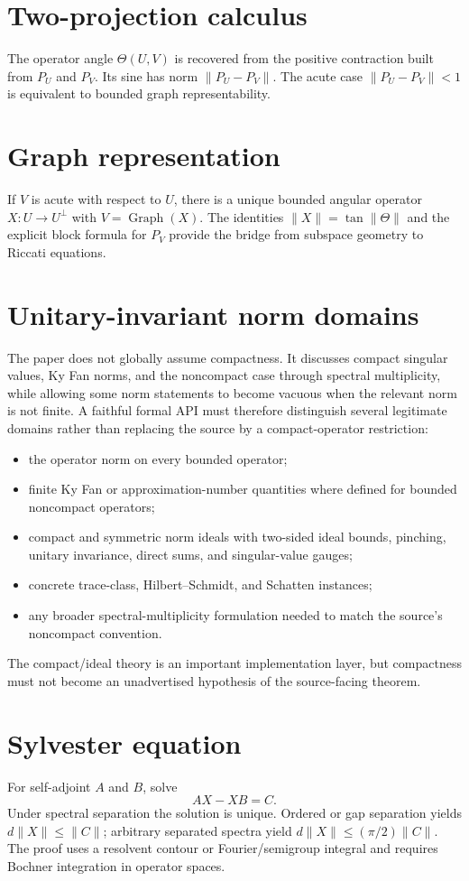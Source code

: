 \documentclass{article}
\newcommand{\Graph}{\operatorname{Graph}}
\begin{document}
\section{Two-projection calculus}
The operator angle $\Theta(U,V)$ is recovered from the positive contraction
built from $P_U$ and $P_V$.  Its sine has norm $\|P_U-P_V\|$.  The acute case
$\|P_U-P_V\|<1$ is equivalent to bounded graph representability.

\section{Graph representation}
If $V$ is acute with respect to $U$, there is a unique bounded angular
operator $X:U\to U^\perp$ with $V=\Graph(X)$.  The identities
$\|X\|=\tan\|\Theta\|$ and the explicit block formula for $P_V$ provide the
bridge from subspace geometry to Riccati equations.

\section{Unitary-invariant norm domains}
The paper does not globally assume compactness. It discusses compact singular
values, Ky Fan norms, and the noncompact case through spectral multiplicity,
while allowing some norm statements to become vacuous when the relevant norm
is not finite. A faithful formal API must therefore distinguish several
legitimate domains rather than replacing the source by a compact-operator
restriction:
\begin{itemize}
\item the operator norm on every bounded operator;
\item finite Ky Fan or approximation-number quantities where defined for
bounded noncompact operators;
\item compact and symmetric norm ideals with two-sided ideal bounds, pinching,
unitary invariance, direct sums, and singular-value gauges;
\item concrete trace-class, Hilbert--Schmidt, and Schatten instances;
\item any broader spectral-multiplicity formulation needed to match the
source's noncompact convention.
\end{itemize}
The compact/ideal theory is an important implementation layer, but compactness
must not become an unadvertised hypothesis of the source-facing theorem.

\section{Sylvester equation}
For self-adjoint $A$ and $B$, solve
\[
  AX-XB=C.
\]
Under spectral separation the solution is unique.  Ordered or gap separation
yields $d\|X\|\le\|C\|$; arbitrary separated spectra yield
$d\|X\|\le(\pi/2)\|C\|$.  The proof uses a resolvent contour or Fourier/semigroup
integral and requires Bochner integration in operator spaces.
\end{document}
